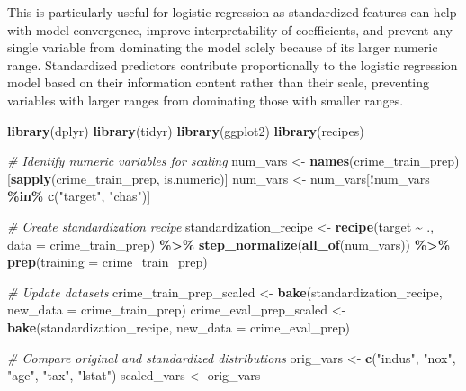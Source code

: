 \documentclass[
]{article}
\newenvironment{Shaded}{\begin{snugshade}}{\end{snugshade}}
\newcommand{\AttributeTok}[1]{\textcolor[rgb]{0.13,0.29,0.53}{#1}}
\newcommand{\CommentTok}[1]{\textcolor[rgb]{0.56,0.35,0.01}{\textit{#1}}}
\newcommand{\FunctionTok}[1]{\textcolor[rgb]{0.13,0.29,0.53}{\textbf{#1}}}
\newcommand{\NormalTok}[1]{#1}
\newcommand{\OtherTok}[1]{\textcolor[rgb]{0.56,0.35,0.01}{#1}}
\newcommand{\SpecialCharTok}[1]{\textcolor[rgb]{0.81,0.36,0.00}{\textbf{#1}}}
\newcommand{\StringTok}[1]{\textcolor[rgb]{0.31,0.60,0.02}{#1}}
\begin{document}
This is particularly useful for logistic regression as standardized
features can help with model convergence, improve interpretability of
coefficients, and prevent any single variable from dominating the model
solely because of its larger numeric range. Standardized predictors
contribute proportionally to the logistic regression model based on
their information content rather than their scale, preventing variables
with larger ranges from dominating those with smaller ranges.

\begin{Shaded}
\begin{Highlighting}[]
\FunctionTok{library}\NormalTok{(dplyr)}
\FunctionTok{library}\NormalTok{(tidyr)}
\FunctionTok{library}\NormalTok{(ggplot2)}
\FunctionTok{library}\NormalTok{(recipes)}

\CommentTok{\# Identify numeric variables for scaling}
\NormalTok{num\_vars }\OtherTok{\textless{}{-}} \FunctionTok{names}\NormalTok{(crime\_train\_prep)[}\FunctionTok{sapply}\NormalTok{(crime\_train\_prep, is.numeric)]}
\NormalTok{num\_vars }\OtherTok{\textless{}{-}}\NormalTok{ num\_vars[}\SpecialCharTok{!}\NormalTok{num\_vars }\SpecialCharTok{\%in\%} \FunctionTok{c}\NormalTok{(}\StringTok{"target"}\NormalTok{, }\StringTok{"chas"}\NormalTok{)]}

\CommentTok{\# Create standardization recipe}
\NormalTok{standardization\_recipe }\OtherTok{\textless{}{-}} \FunctionTok{recipe}\NormalTok{(target }\SpecialCharTok{\textasciitilde{}}\NormalTok{ ., }\AttributeTok{data =}\NormalTok{ crime\_train\_prep) }\SpecialCharTok{\%\textgreater{}\%}
  \FunctionTok{step\_normalize}\NormalTok{(}\FunctionTok{all\_of}\NormalTok{(num\_vars)) }\SpecialCharTok{\%\textgreater{}\%}
  \FunctionTok{prep}\NormalTok{(}\AttributeTok{training =}\NormalTok{ crime\_train\_prep)}

\CommentTok{\# Update datasets}
\NormalTok{crime\_train\_prep\_scaled }\OtherTok{\textless{}{-}} \FunctionTok{bake}\NormalTok{(standardization\_recipe, }\AttributeTok{new\_data =}\NormalTok{ crime\_train\_prep)}
\NormalTok{crime\_eval\_prep\_scaled }\OtherTok{\textless{}{-}} \FunctionTok{bake}\NormalTok{(standardization\_recipe, }\AttributeTok{new\_data =}\NormalTok{ crime\_eval\_prep)}

\CommentTok{\# Compare original and standardized distributions}
\NormalTok{orig\_vars }\OtherTok{\textless{}{-}} \FunctionTok{c}\NormalTok{(}\StringTok{"indus"}\NormalTok{, }\StringTok{"nox"}\NormalTok{, }\StringTok{"age"}\NormalTok{, }\StringTok{"tax"}\NormalTok{, }\StringTok{"lstat"}\NormalTok{)}
\NormalTok{scaled\_vars }\OtherTok{\textless{}{-}}\NormalTok{ orig\_vars}


\end{Highlighting}
\end{Shaded}
\end{document}

